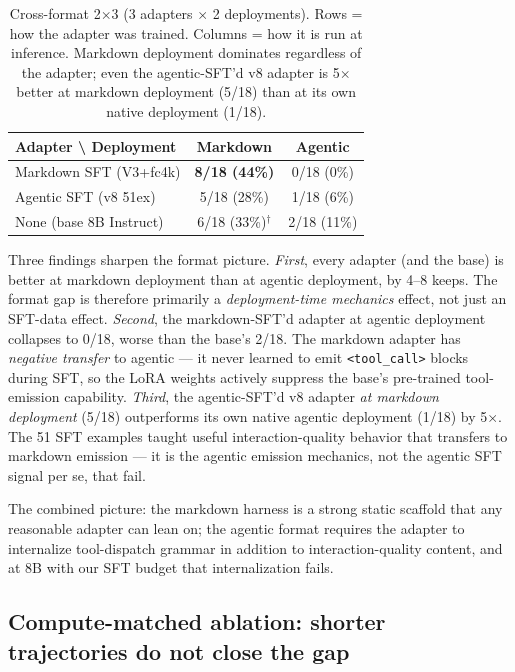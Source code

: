 \documentclass[11pt]{article}
\begin{document}
\begin{table}[ht]
\centering
\caption{Cross-format 2$\times$3 (3 adapters $\times$ 2 deployments). Rows = how the adapter was trained. Columns = how it is run at inference. Markdown deployment dominates regardless of the adapter; even the agentic-SFT'd v8 adapter is 5$\times$ better at markdown deployment (5/18) than at its own native deployment (1/18).}
\label{tab:crossformat}
\begin{tabular}{lcc}
\toprule
Adapter \textbackslash{} Deployment & Markdown & Agentic \\
\midrule
Markdown SFT (V3+fc4k) & \textbf{8/18 (44\%)} & 0/18 (0\%) \\
Agentic SFT (v8 51ex) & 5/18 (28\%) & 1/18 (6\%) \\
None (base 8B Instruct) & 6/18 (33\%)$^{\dagger}$ & 2/18 (11\%) \\
\bottomrule
\end{tabular}
\end{table}

Three findings sharpen the format picture.
\textit{First}, every adapter (and the base) is better at markdown deployment than at agentic deployment, by 4--8 keeps. The format gap is therefore primarily a \emph{deployment-time mechanics} effect, not just an SFT-data effect.
\textit{Second}, the markdown-SFT'd adapter at agentic deployment collapses to 0/18, worse than the base's 2/18. The markdown adapter has \emph{negative transfer} to agentic --- it never learned to emit \texttt{<tool\_call>} blocks during SFT, so the LoRA weights actively suppress the base's pre-trained tool-emission capability.
\textit{Third}, the agentic-SFT'd v8 adapter \emph{at markdown deployment} (5/18) outperforms its own native agentic deployment (1/18) by 5$\times$. The 51 SFT examples taught useful interaction-quality behavior that transfers to markdown emission --- it is the agentic emission mechanics, not the agentic SFT signal per se, that fail.

The combined picture: the markdown harness is a strong static scaffold that any reasonable adapter can lean on; the agentic format requires the adapter to internalize tool-dispatch grammar in addition to interaction-quality content, and at 8B with our SFT budget that internalization fails.

\subsection{Compute-matched ablation: shorter trajectories do not close the gap}
\end{document}
